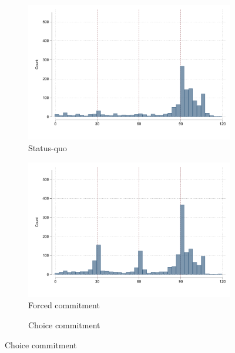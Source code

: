 \documentclass[oneside,11pt]{article}
\begin{document}
{\begin{figure}[H]
    \caption{Histogram of payments}
    \label{hist_payments}
    \begin{center}
    \begin{subfigure}{0.31\textwidth}
        \caption{Status-quo}
        \centering
        \includegraphics[width=\textwidth]{Figuras/hist_payments_sq.pdf}
    \end{subfigure}
    \begin{subfigure}{0.31\textwidth}
        \caption{Forced commitment}
        \centering
        \includegraphics[width=\textwidth]{Figuras/hist_payments_fc.pdf}
    \end{subfigure}
    \begin{subfigure}{0.31\textwidth}
        \caption{Choice commitment}
        \centering

\end{subfigure}
\end{center}
\end{figure}}
\end{document}
